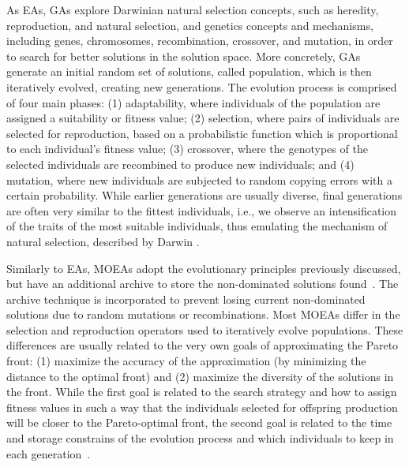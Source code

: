 	As \acp{EA}, \acp{GA} explore Darwinian natural selection concepts, such as heredity, reproduction, and natural selection, and genetics concepts and mechanisms, including genes, chromosomes, recombination, crossover, and mutation, in order to search for better solutions in the solution space. More concretely, \acp{GA} generate an initial random set of solutions, called population, which is then iteratively evolved, creating new generations. The evolution process is comprised of four main phases: (1) adaptability, where individuals of the population are assigned a suitability or fitness value; (2) selection, where pairs of individuals are selected for reproduction, based on a probabilistic function which is proportional to each individual's fitness value; (3) crossover, where the genotypes of the selected individuals are recombined to produce new individuals; and (4) mutation, where new individuals are subjected to random copying errors with a certain probability. While earlier generations are usually diverse, final generations are often very similar to the fittest individuals, i.e., we observe an intensification of the traits of the most suitable individuals, thus emulating the mechanism of natural selection, described by Darwin \cite{Brownlee2011}. %
	
	Similarly to \acp{EA}, \acp{MOEA} adopt the evolutionary principles previously discussed, but have an additional archive to store the non-dominated solutions found~\cite{Zitzler2001SPEA2}. The archive technique is incorporated to prevent losing current non-dominated solutions due to random mutations or recombinations. Most \acp{MOEA} differ in the selection and reproduction operators used to iteratively evolve populations. These differences are usually related to the very own goals of approximating the Pareto front: (1) maximize the accuracy of the approximation (by minimizing the distance to the optimal front) and (2) maximize the diversity of the solutions in the front. While the first goal is related to the search strategy and how to assign fitness values in such a way that the individuals selected for offspring production will be closer to the Pareto-optimal front, the second goal is related to the time and storage constrains of the evolution process and which individuals to keep in each generation~\cite{Zitzler2001SPEA2}.
	
